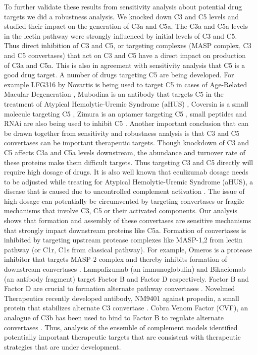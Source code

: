 \documentclass[12pt]{article}
\begin{document}
To further validate these results from sensitivity analysis about potential drug targets we did a robustness analysis. We knocked down C3 and C5 levels and studied their impact on the generation of C3a and C5a. The C3a and C5a levels in the lectin pathway were strongly influenced by initial levels of C3 and C5. Thus direct inhibition of C3 and C5, or targeting complexes (MASP complex, C3 and C5 convertases) that act on C3 and C5 have a direct impact on production of C3a and C5a. This is also in agreement with sensitivity analysis that C5 is a good drug target. A number of drugs targeting C5 are being developed. For example LFG316 by Novartis is being used to target C5 in cases of Age-Related Macular Degeneration \cite{roguska2014generation}, Mubodina is an antibody that targets C5 in the treatment of Atypical Hemolytic-Uremic Syndrome (aHUS) \cite{melis2015complement}, Coversin is a small molecule targeting C5 \cite{weston2014clinical}, Zimura is an aptamer targeting C5 \cite{epstein2007complement}, small peptides and RNAi are also being used to inhibit C5 \cite{borodovsky2014aln}. Another important conclusion that can be drawn together from sensitivity and robustness analysis is that C3 and C5 convertases can be important therapeutic targets. Though knockdown of C3 and C5 affects C3a and C5a levels downstream, the abundance and turnover rate \cite{sissons1977metabolism, swaak1982determination} of these proteins make them difficult targets. Thus targeting C3 and C5 directly will require high dosage of drugs. It is also well known that eculizumab dosage needs to be adjusted while treating for Atypical Hemolytic-Uremic Syndrome (aHUS), a disease that is caused due to uncontrolled complement activation \cite{noris2014dynamics}. The issue of high dosage can potentially be circumvented by targeting convertases or fragile mechanisms that involve C3, C5 or their activated components. Our analysis shows that formation and assembly of these convertases are sensitive mechanisms that strongly impact downstream proteins like C5a. Formation of convertases is inhibited by targeting upstream protease complexes like MASP-1,2 from lectin pathway (or C1r, C1s from classical pathway). For example, Omeros is a protease inhibitor that targets MASP-2 complex and thereby inhibits formation of downstream convertases \cite{schwaeble2011methods}. Lampalizumab (an immunoglobulin) and Bikaciomab (an antibody fragment) target Factor B and Factor D respectively. Factor B and Factor D are crucial to formation alternate pathway convertases \cite{katschke2012inhibiting, hu2013therapeutic}. Novelmed Therapeutics recently developed antibody, NM9401 against propedin, a small protein that stabilizes alternate C3 convertase \cite{bansal2014humanized}. Cobra Venom Factor (CVF), an analogue of C3b has been used to bind to Factor B to regulate alternate convertases \cite{vogel2004recombinant}.  Thus, analysis of the ensemble of complement models identified potentially important therapeutic targets that are consistent with therapeutic strategies that are under development.
\end{document}
